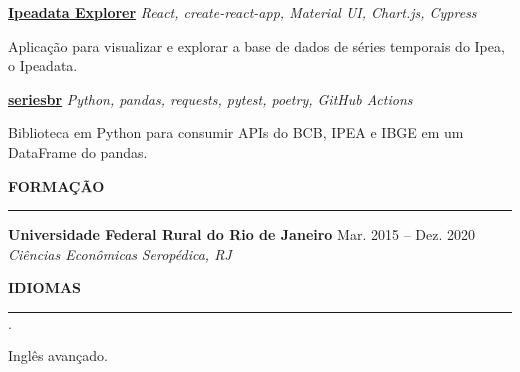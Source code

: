 \documentclass[11pt,letterpaper]{article}
\newenvironment{tightlist}
  {\begin{list}
    {$\cdot$}
    {
      \setlength{\leftmargin}{0em}
      \setlength{\itemsep}{-\smallskipamount}
    }
  }
{\end{list}}
\begin{document}
\smallskip

\textbf{\href{http://ipeadata-explorer.surge.sh}{Ipeadata Explorer}} \hfill \emph{React, create-react-app, Material UI, Chart.js, Cypress}
{\parfillskip=0pt\par}
Aplicação para visualizar e explorar a base de dados de séries temporais do Ipea, o Ipeadata.

\smallskip

\textbf{\href{https://github.com/phelipetls/seriesbr}{seriesbr}} \hfill \emph{Python, pandas, requests, pytest, poetry, GitHub Actions}
{\parfillskip=0pt\par}
Biblioteca em Python para consumir APIs do BCB, IPEA e IBGE em um DataFrame do pandas.

\medskip \textbf{FORMAÇÃO} \medskip
\hrule

\textbf{Universidade Federal Rural do Rio de Janeiro} \hfill {Mar. 2015 -- Dez. 2020} \\
\emph{Ciências Econômicas} \hfill \emph{Seropédica, RJ} {\parfillskip=0pt\par}

\medskip \textbf{IDIOMAS} \medskip
\hrule

\begin{tightlist}
  \item Inglês avançado.
\end{tightlist}
\end{document}
